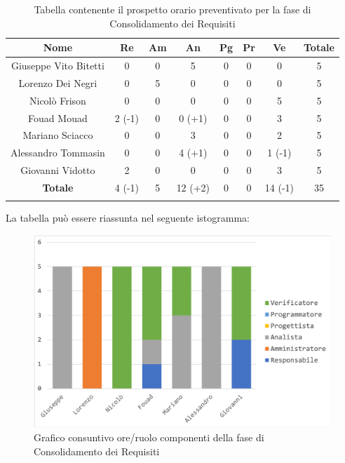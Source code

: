 			\begin{longtable}{|c|c|c|c|c|c|c|c}
				\hline
				\rowcolor{lighter-grayer}
				\textbf{Nome} & \textbf{Re} & \textbf{Am} & \textbf{An} & \textbf{Pg}  & \textbf{Pr}   & \textbf{Ve} & \textbf{Totale} \\
				\hline
				\endfirsthead
				
				\hline
				Giuseppe Vito Bitetti & 0 & 0 & 5 & 0 & 0 & 0 & 5\\
				\hline
				\hline
				Lorenzo Dei Negri & 0 & 5 & 0 & 0 & 0 & 0 & 5\\
				\hline
				\hline
				Nicolò Frison & 0 & 0 & 0 & 0 & 0 & 5 & 5\\
				\hline
				\hline
				Fouad Mouad & 2 (-1) & 0 & 0 (+1) & 0 & 0 & 3 & 5\\
				\hline
				\hline
				Mariano Sciacco & 0 & 0 & 3 & 0 & 0 & 2 & 5\\
				\hline
				\hline
				Alessandro Tommasin & 0 & 0 & 4 (+1) & 0 & 0 & 1 (-1) & 5\\
				\hline
				\hline
				Giovanni Vidotto & 2 & 0 & 0 & 0 & 0 & 3 & 5\\
				\hline 
				\textbf{Totale} & 4 (-1) &  5 & 12 (+2) & 0 & 0 & 14 (-1) & 35\\
				\hline
				\caption{Tabella contenente il prospetto orario preventivato per la fase di Consolidamento dei Requisiti}
			\end{longtable}
			\pagebreak	
			
			La tabella può essere riassunta nel seguente istogramma:
			
			\begin{figure}[H]
				\centering
				\includegraphics[width=0.8\linewidth]{./images/ConsReqCons.png}
				\caption{Grafico consuntivo ore/ruolo componenti della fase di Consolidamento dei Requisiti}
				\label{fig:consuntivo grafico suddivione ruoli fase di Consolidamento dei Requisiti}
			\end{figure}
			
